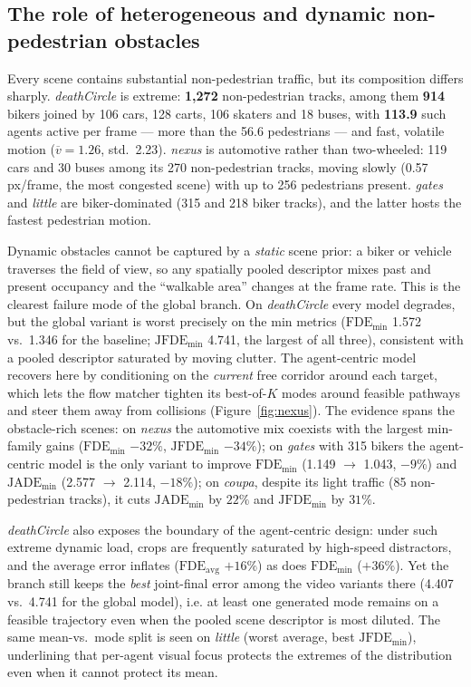 \documentclass[11pt,a4paper]{article}
\begin{document}
\subsection{The role of heterogeneous and dynamic non-pedestrian obstacles}

Every scene contains substantial non-pedestrian traffic, but its composition
differs sharply. \emph{deathCircle} is extreme: \textbf{1{,}272} non-pedestrian
tracks, among them \textbf{914} bikers joined by 106 cars, 128 carts, 106
skaters and 18 buses, with \textbf{113.9} such agents active per frame --- more
than the 56.6 pedestrians --- and fast, volatile motion ($\overline v = 1.26$,
std.\ 2.23). \emph{nexus} is automotive rather than two-wheeled: 119 cars and
30 buses among its 270 non-pedestrian tracks, moving slowly (0.57 px/frame,
the most congested scene) with up to 256 pedestrians present. \emph{gates} and
\emph{little} are biker-dominated (315 and 218 biker tracks), and the latter
hosts the fastest pedestrian motion.

Dynamic obstacles cannot be captured by a {\em static} scene prior: a biker or
vehicle traverses the field of view, so any spatially pooled descriptor mixes
past and present occupancy and the ``walkable area'' changes at the frame
rate. This is the clearest failure mode of the global branch. On
\emph{deathCircle} every model degrades, but the global variant is worst
precisely on the min metrics ($\mathrm{FDE_{min}}$ 1.572 vs.\ 1.346 for the
baseline; $\mathrm{JFDE_{min}}$ 4.741, the largest of all three), consistent
with a pooled descriptor saturated by moving clutter. The agent-centric model
recovers here by conditioning on the \emph{current} free corridor around each
target, which lets the flow matcher tighten its best-of-$K$ modes around
feasible pathways and steer them away from collisions (Figure~\ref{fig:nexus}).
The evidence spans the
obstacle-rich scenes: on \emph{nexus} the automotive mix coexists with the
largest min-family gains ($\mathrm{FDE_{min}}$ $-32\%$,
$\mathrm{JFDE_{min}}$ $-34\%$); on \emph{gates} with 315 bikers the
agent-centric model is the only variant to improve $\mathrm{FDE_{min}}$
(1.149 $\to$ 1.043, $-9\%$) and $\mathrm{JADE_{min}}$ (2.577 $\to$ 2.114,
$-18\%$); on \emph{coupa}, despite its light traffic (85 non-pedestrian
tracks), it cuts $\mathrm{JADE_{min}}$ by $22\%$ and $\mathrm{JFDE_{min}}$ by
$31\%$.

\emph{deathCircle} also exposes the boundary of the agent-centric design:
under such extreme dynamic load, crops are frequently saturated by
high-speed distractors, and the average error inflates ($\mathrm{FDE_{avg}}$
$+16\%$) as does $\mathrm{FDE_{min}}$ ($+36\%$). Yet the branch still keeps the
{\em best} joint-final error among the video variants there (4.407 vs.\ 4.741
for the global model), i.e. at least one generated mode remains on a feasible
trajectory even when the pooled scene descriptor is most diluted. The same
mean-vs.\ mode split is seen on \emph{little} (worst average, best
$\mathrm{JFDE_{min}}$), underlining that per-agent visual focus protects the
extremes of the distribution even when it cannot protect its mean.
\end{document}
